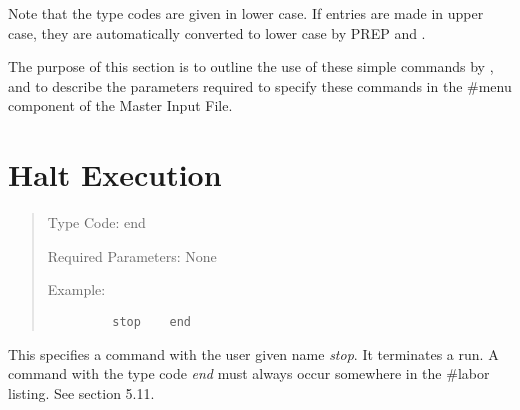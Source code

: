 \noindent Note that the type codes are given in lower case.  If entries are made in
upper case, they are automatically converted to lower case by PREP and
\Maryend.

     The purpose of this section is to outline the use of these simple
commands by \Maryend, and to describe the parameters required to specify
these commands in the \#menu component of the Master Input File.

\newpage
\section{Halt Execution}
\begin{quotation}
\noindent Type Code:  end 
\vspace{5mm}

\noindent Required Parameters:  None
\vspace{5mm}

\noindent Example:
\begin{verbatim}
         stop    end
\end{verbatim}
\end{quotation}
This specifies a command with the user given name {\em stop}.  It terminates a
\Mary run.  A command with the type code {\em end } must always occur
somewhere in the \#labor listing.  See section 5.11.

\newpage
